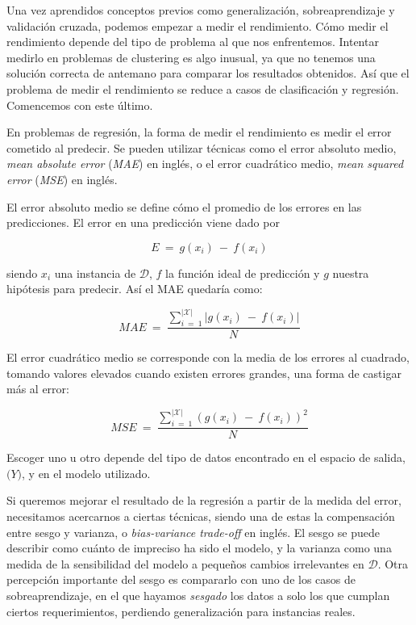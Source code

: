 Una vez aprendidos conceptos previos como generalización, sobreaprendizaje y validación cruzada, podemos empezar a medir el rendimiento. Cómo medir el rendimiento depende del tipo de problema al que nos enfrentemos. Intentar medirlo en problemas de clustering es algo inusual, ya que no tenemos una solución correcta de antemano para comparar los resultados obtenidos. Así que el problema de medir el rendimiento se reduce a casos de clasificación y regresión. Comencemos con este último.

En problemas de regresión, la forma de medir el rendimiento es medir el error cometido al predecir. Se pueden utilizar técnicas como el error absoluto medio, \emph{mean absolute error} (\emph{MAE}) en inglés, o el error cuadrático medio, \emph{mean squared error} (\emph{MSE}) en inglés.

El error absoluto medio se define cómo el promedio de los errores en las predicciones. El error en una predicción viene dado por

$$
E\:=\:g(x_{i})\:-\:f(x_{i})
$$

\noindent
siendo $x_{i}$ una instancia de $\mathcal{D}$, $f$ la función ideal de predicción y $g$ nuestra hipótesis para predecir. Así el MAE quedaría como:

$$
MAE\:=\:\frac{\sum_{i\:=\:1}^{|\mathcal{X}|}|g(x_{i})\:-\:f(x_{i})|}{N}
$$

El error cuadrático medio se corresponde con la media de los errores al cuadrado, tomando valores elevados cuando existen errores grandes, una forma de castigar más al error:

$$
MSE\:=\:\frac{\sum_{i\:=\:1}^{|\mathcal{X}|}(g(x_{i})\:-\:f(x_{i}))^{2}}{N}
$$

Escoger uno u otro depende del tipo de datos encontrado en el espacio de salida, $\mathcal(Y)$, y en el modelo utilizado.

Si queremos mejorar el resultado de la regresión a partir de la medida del error, necesitamos acercarnos a ciertas técnicas, siendo una de estas la compensación entre sesgo y varianza, o \emph{bias-variance trade-off} en inglés. El sesgo se puede describir como cuánto de impreciso ha sido el modelo, y la varianza como una medida de la sensibilidad del modelo a pequeños cambios irrelevantes en $\mathcal{D}$. Otra percepción importante del sesgo es compararlo con uno de los casos de sobreaprendizaje, en el que hayamos \emph{sesgado} los datos a solo los que cumplan ciertos requerimientos, perdiendo generalización para instancias reales.

